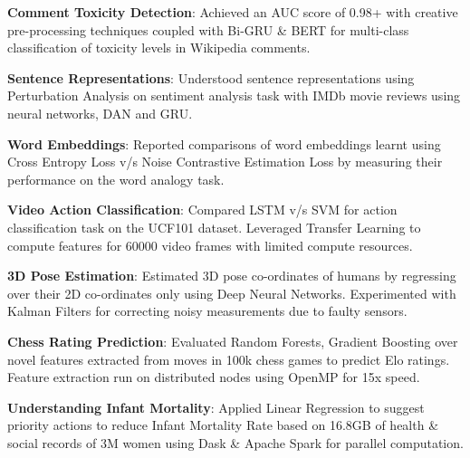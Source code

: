 \documentclass[letterpaper,10pt]{article}
\newcommand{\resumeItem}[2]{
	\item\normalsize{
		\textbf{#1}{: #2}
	}\vspace{-2pt}
}
\newcommand{\resumeItemText}[1]{
	\item\normalsize{
		{#1}
	}\vspace{-2pt}
}
\newcommand{\resumeSubItem}[2]{\resumeItem{#1}{#2}\vspace{0pt}}
\newcommand{\resumeSubItemText}[1]{\resumeItemText{#1}\vspace{-2pt}}
\begin{document}
	\resumeSubItem{Comment Toxicity Detection}{Achieved an AUC score of 0.98+ with creative pre-processing techniques coupled with Bi-GRU \& BERT for multi-class classification of toxicity levels in Wikipedia comments.}
	\resumeSubItem{Sentence Representations}{Understood sentence representations using Perturbation Analysis on sentiment analysis task with IMDb movie reviews using neural networks, DAN and GRU.}
	\resumeSubItem{Word Embeddings}{Reported comparisons of word embeddings learnt using Cross Entropy Loss v/s Noise Contrastive Estimation Loss by measuring their performance on the word analogy task.}
	\resumeSubItem{Video Action Classification}{Compared LSTM v/s SVM for action classification task on the UCF101 dataset. Leveraged Transfer Learning to compute features for 60000 video frames with limited compute resources.}
	\resumeSubItem{3D Pose Estimation}{Estimated 3D pose co-ordinates of humans by regressing over their 2D co-ordinates only using Deep Neural Networks. Experimented with Kalman Filters for correcting noisy measurements due to faulty sensors.}
	\resumeSubItem{Chess Rating Prediction}{Evaluated Random Forests, Gradient Boosting over novel features extracted from moves in 100k chess games to predict Elo ratings. Feature extraction run on distributed nodes using OpenMP for 15x speed.}
	\resumeSubItem{Understanding Infant Mortality}{Applied Linear Regression to suggest priority actions to reduce Infant Mortality Rate based on 16.8GB of health \& social records of 3M women using Dask \& Apache Spark for parallel computation.}
	
\end{document}
